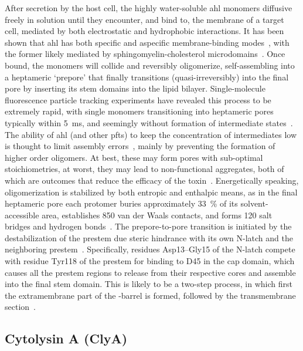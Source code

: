 After secretion by the host cell, the highly water-soluble \gls{ahl} monomers diffusive freely in solution
until they encounter, and bind to, the membrane of a target cell, mediated by both electrostatic and
hydrophobic interactions. It has been shown that \gls{ahl} has both specific and aspecific membrane-binding
modes~\cite{Hildebrand-1991}, with the former likely mediated by sphingomyelin-cholesterol
microdomains~\cite{Valeva-2006}. Once bound, the monomers will collide and reversibly oligomerize,
self-assembling into a heptameric `prepore' that finally transitions (quasi-irreversibly) into the final pore
by inserting its stem domains into the lipid bilayer. Single-molecule fluorescence particle tracking
experiments have revealed this process to be extremely rapid, with single monomers transitioning into
heptameric pores typically within \SI{5}{\ms}, and seemingly without formation of intermediate
states~\cite{Thompson-2011}. The ability of \gls{ahl} (and other \glspl{pft}) to keep the concentration of
intermediates low is thought to limit assembly errors~\cite{Lee-2016b}, mainly by preventing the formation of
higher order oligomers. At best, these may form pores with sub-optimal stoichiometries, at worst, they may
lead to non-functional aggregates, both of which are outcomes that reduce the efficacy of the
toxin~\cite{Fahie-2013,Subburaj-2015}. Energetically speaking, oligomerization is stabilized by both entropic
and enthalpic means, as in the final heptameric pore each protomer buries approximately \SI{33}{\percent} of
its solvent-accessible area, establishes 850 van der Waals contacts, and forms 120 salt bridges and hydrogen
bonds~\cite{Song-1996}. The prepore-to-pore transition is initiated by the destabilization of the prestem due
steric hindrance with its own N-latch and the neighboring prestem~\cite{Sugawara-2015}. Specifically, residues
Asp13--Gly15 of the N-latch compete with residue Tyr118 of the prestem for binding to D45 in the cap domain,
which causes all the prestem regions to release from their respective cores and assemble into the final stem
domain. This is likely to be a two-step process, in which first the extramembrane part of the \tb-barrel is
formed, followed by the transmembrane section~\cite{Sugawara-2015}.



\subsection{Cytolysin A (ClyA)}
%
\label{sec:np:clya}
%

